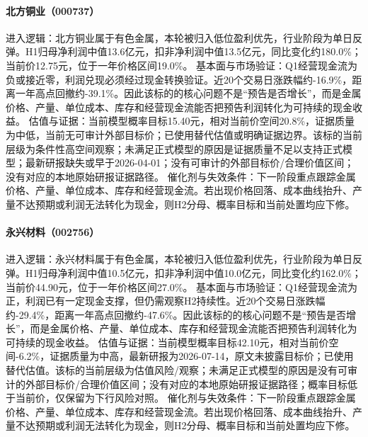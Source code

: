 \paragraph{北方铜业（000737）}
进入逻辑：北方铜业属于有色金属，本轮被归入低位盈利优先，行业阶段为单日反弹。H1归母净利润中值13.6亿元，扣非净利润中值13.5亿元，同比变化约180.0\%；当前价12.75元，位于一年价格区间19.0\%。
基本面与市场验证：Q1经营现金流为负或接近零，利润兑现必须经过现金转换验证。近20个交易日涨跌幅约-16.9\%，距离一年高点回撤约-39.1\%。因此该标的的核心问题不是“预告是否增长”，而是金属价格、产量、单位成本、库存和经营现金流能否把预告利润转化为可持续的现金收益。
估值与证据：当前模型概率目标15.40元，相对当前价空间20.8\%，证据质量为中低，当前无可审计外部目标价；已使用替代估值或明确证据边界。该标的当前层级为条件性高空间观察；未满足正式模型的原因是证据质量不足以支持正式模型；最新研报缺失或早于2026-04-01；没有可审计的外部目标价/合理价值区间；没有对应的本地原始研报证据路径。
催化剂与失效条件：下一阶段重点跟踪金属价格、产量、单位成本、库存和经营现金流。若出现价格回落、成本曲线抬升、产量不达预期或利润无法转化为现金，则H2分母、概率目标和当前处置均应下修。

\paragraph{永兴材料（002756）}
进入逻辑：永兴材料属于有色金属，本轮被归入低位盈利优先，行业阶段为单日反弹。H1归母净利润中值10.5亿元，扣非净利润中值10.0亿元，同比变化约162.0\%；当前价44.90元，位于一年价格区间27.0\%。
基本面与市场验证：Q1经营现金流为正，利润已有一定现金支撑，但仍需观察H2持续性。近20个交易日涨跌幅约-29.4\%，距离一年高点回撤约-47.6\%。因此该标的的核心问题不是“预告是否增长”，而是金属价格、产量、单位成本、库存和经营现金流能否把预告利润转化为可持续的现金收益。
估值与证据：当前模型概率目标42.10元，相对当前价空间-6.2\%，证据质量为中高，最新研报为2026-07-14，原文未披露目标价；已使用替代估值。该标的当前层级为估值风险/观察；未满足正式模型的原因是没有可审计的外部目标价/合理价值区间；没有对应的本地原始研报证据路径；概率目标低于当前价，仅保留为下行风险对照。
催化剂与失效条件：下一阶段重点跟踪金属价格、产量、单位成本、库存和经营现金流。若出现价格回落、成本曲线抬升、产量不达预期或利润无法转化为现金，则H2分母、概率目标和当前处置均应下修。

